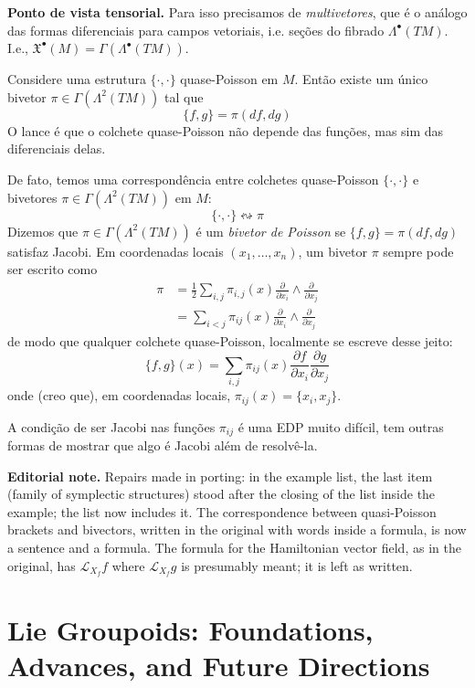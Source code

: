 \medskip\noindent
{\bf Ponto de vista tensorial.}
Para isso precisamos de \emph{multivetores},
que é o análogo das formas diferenciais para
campos vetoriais, i.e. seções do fibrado
$\Lambda^{\bullet}(TM)$. I.e.,
$\mathfrak{X}^\bullet(M)=
\Gamma(\Lambda^{\bullet}(TM))$.

Considere uma estrutura $\{\cdot ,\cdot \}$
quase-Poisson em $M$. Então existe um único
bivetor $\pi \in \Gamma(\Lambda^{2}(TM))$ tal
que
$$
\{f,g\}=\pi(df,dg)
$$
O lance é que o colchete quase-Poisson não
depende das funções, mas sim das diferenciais
delas.

De fato, temos uma correspondência entre
colchetes quase-Poisson $\{\cdot ,\cdot \}$ e
bivetores $\pi \in \Gamma(\Lambda^{2}(TM))$
em $M$:
$$
\{\cdot ,\cdot \} \leftrightsquigarrow \pi
$$
Dizemos que $\pi \in \Gamma(\Lambda^{2}(TM))$
é um \emph{bivetor de Poisson} se
$\{f,g\}=\pi(df,dg)$ satisfaz Jacobi. Em
coordenadas locais $(x_1,\ldots,x_n)$, um
bivetor $\pi$ sempre pode ser escrito como
$$
\begin{aligned}
\pi &=\frac{1}{2}\sum_{i,j}\pi_{i,j}(x)
\frac{\partial }{\partial x_i}\wedge
\frac{\partial }{\partial x_j} \\
&=\sum_{i<j}\pi_{ij}(x)\frac{\partial
}{\partial x_i}\wedge\frac{\partial
}{\partial x_j}
\end{aligned}
$$
de modo que qualquer colchete quase-Poisson,
localmente se escreve desse jeito:
$$
\{f,g\}(x)=\sum_{i,j}\pi_{ij}(x)
\frac{\partial
f}{\partial x_i}\frac{\partial g}{\partial
x_j}
$$
onde (creo que), em coordenadas locais,
$\pi_{ij}(x)=\{x_i,x_j\}$.
\begin{remark}
\label{remark-bursztyn-jacobi-pde}
A condição de ser Jacobi nas funções
$\pi_{ij}$ é uma EDP muito difícil, tem
outras formas de mostrar que algo é Jacobi
além de resolvê-la.
\end{remark}

\medskip\noindent
{\bf Editorial note.} Repairs made in
porting: in the example list, the last item
(family of symplectic structures) stood
after the closing of the list inside the
example; the list now includes it. The
correspondence between quasi-Poisson
brackets and bivectors, written in the
original with words inside a formula, is
now a sentence and a formula. The formula
for the Hamiltonian vector field, as in the
original, has $\mathcal{L}_{X_f}f$ where
$\mathcal{L}_{X_f}g$ is presumably meant; it
is left as written.

\section{Lie Groupoids: Foundations,
Advances,
and Future Directions}
\label{section-lie-groupoids-foundations}


